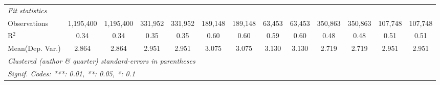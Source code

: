 \begin{tabular}{lcccccccccccc}
   \midrule
   \emph{Fit statistics}\\
   Observations                             & 1,195,400      & 1,195,400    & 331,952       & 331,952       & 189,148       & 189,148 & 63,453  & 63,453       & 350,863       & 350,863       & 107,748      & 107,748\\  
   R$^2$                                    & 0.34           & 0.34         & 0.35          & 0.35          & 0.60          & 0.60    & 0.59    & 0.60         & 0.48          & 0.48          & 0.51         & 0.51\\  
Mean(Dep. Var.) & 2.864 & 2.864 & 2.951 & 2.951 & 3.075 & 3.075 & 3.130 & 3.130 & 2.719 & 2.719 & 2.951 & 2.951 \\
   \midrule \midrule
   \multicolumn{13}{l}{\emph{Clustered (author \& quarter) standard-errors in parentheses}}\\
   \multicolumn{13}{l}{\emph{Signif. Codes: ***: 0.01, **: 0.05, *: 0.1}}\\
\end{tabular}
\par\endgroup
